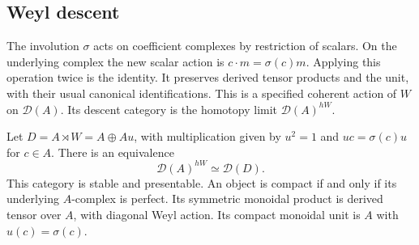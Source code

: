 \subsection{Weyl descent}

The involution $\sigma$ acts on coefficient complexes by restriction of scalars.
On the underlying complex the new scalar action is $c\cdot m=\sigma(c)m$.
Applying this operation twice is the identity.
It preserves derived tensor products and the unit, with their usual canonical identifications.
This is a specified coherent action of $W$ on $\mathcal D(A)$.
Its descent category is the homotopy limit $\mathcal D(A)^{hW}$.

\begin{proposition}
\label{v4-arith:eis:parameter-descent}
Let $D=A\rtimes W=A\oplus Au$, with multiplication given by
$u^2=1$ and $uc=\sigma(c)u$ for $c\in A$.
There is an equivalence
\[
 \mathcal D(A)^{hW}\simeq\mathcal D(D).
\]
This category is stable and presentable.
An object is compact if and only if its underlying $A$-complex is perfect.
Its symmetric monoidal product is derived tensor over $A$, with diagonal Weyl action.
Its compact monoidal unit is $A$ with $u(c)=\sigma(c)$.
\end{proposition}

